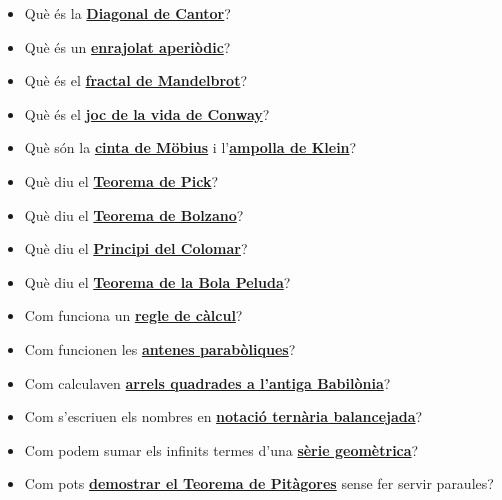 \documentclass[a4paper, 12pt]{article}
\begin{document}
        \begin{itemize}
            \item Què és la \href{https://ca.wikipedia.org/wiki/Diagonalitzaci\%C3\%B3_de_Cantor}{\textbf{Diagonal de Cantor}}?
            \item Què és un \href{https://en.wikipedia.org/wiki/Aperiodic_tiling}{\textbf{enrajolat aperiòdic}}?
            \item Què és el \href{https://ca.wikipedia.org/wiki/Conjunt_de_Mandelbrot}{\textbf{fractal de Mandelbrot}}?
            \item Què és el \href{https://ca.wikipedia.org/wiki/Joc_de_la_vida}{\textbf{joc de la vida de Conway}}?
            \item Què són la \href{https://ca.wikipedia.org/wiki/Cinta_de_M\%C3\%B6bius}{\textbf{cinta de Möbius}} i l'\href{https://ca.wikipedia.org/wiki/Ampolla_de_Klein}{\textbf{ampolla de Klein}}?
            \item Què diu el \href{https://ca.wikipedia.org/wiki/Teorema_de_Pick}{\textbf{Teorema de Pick}}?
            \item Què diu el \href{https://ca.wikipedia.org/wiki/Teorema_del_valor_intermedi}{\textbf{Teorema de Bolzano}}?
            \item Què diu el \href{https://ca.wikipedia.org/wiki/Principi_de_les_caselles}{\textbf{Principi del Colomar}}?
            \item Què diu el \href{https://ca.wikipedia.org/wiki/Teorema_de_la_bola_peluda}{\textbf{Teorema de la Bola Peluda}}?
            \item Com funciona un \href{https://ca.wikipedia.org/wiki/Regle_de_c\%C3\%A0lcul}{\textbf{regle de càlcul}}?
            \item Com funcionen les \href{https://ca.wikipedia.org/wiki/Espill_parab\%C3\%B2lic}{\textbf{antenes parabòliques}}?
            \item Com calculaven \href{https://en.wikipedia.org/wiki/Methods_of_computing_square_roots#Babylonian_method}{\textbf{arrels quadrades a l'antiga Babilònia}}?
            \item Com s'escriuen els nombres en \href{https://en.wikipedia.org/wiki/Balanced_ternary}{\textbf{notació ternària balancejada}}?
            \item Com podem sumar els infinits termes d'una \href{https://ca.wikipedia.org/wiki/S\%C3\%A8rie_geom\%C3\%A8trica}{\textbf{sèrie geomètrica}}?
            \item Com pots \href{https://en.wikipedia.org/wiki/Pythagorean_theorem#Proofs_by_dissection_and_rearrangement}{\textbf{demostrar el Teorema de Pitàgores}} sense fer servir paraules?

\end{itemize}
\end{document}
